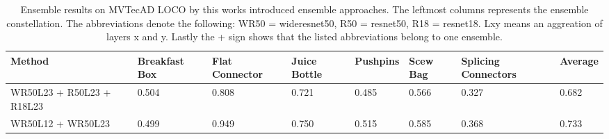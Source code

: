 \begin{table}[htbp]
    \tiny
    \centering
    \begin{tabularx}{\textwidth}{|X|X|X|X|X|X|X|X|}%
        \hline
        \textbf{Method} & \textbf{Breakfast Box} & \textbf{Flat Connector} & \textbf{Juice Bottle} & \textbf{Pushpins} & \textbf{Scew Bag} & \textbf{Splicing Connectors} & \textbf{Average} \\
        \hline
        WR50L23 + R50L23 + R18L23  & 0.504 & 0.808 & 0.721 & 0.485 & 0.566 & 0.327 & 0.682 \\
        \hline
        WR50L12 + WR50L23 & 0.499 & 0.949 & 0.750 & 0.515 & 0.585 & 0.368 & 0.733 \\
        \hline
    \end{tabularx}
    \caption{Ensemble results on MVTecAD LOCO \cite{LOCODentsAndScratchesBergmann2022} by this works introduced ensemble approaches. The leftmost columns represents the ensemble 
             constellation. The abbreviations denote the following: 
             WR50 = wideresnet50, R50 = resnet50, R18 = resnet18. Lxy means an aggreation of layers x and y. Lastly the + sign shows that the listed abbreviations belong to one ensemble.}
    \label{tab:ensemblepixelAUROC}
\end{table}


